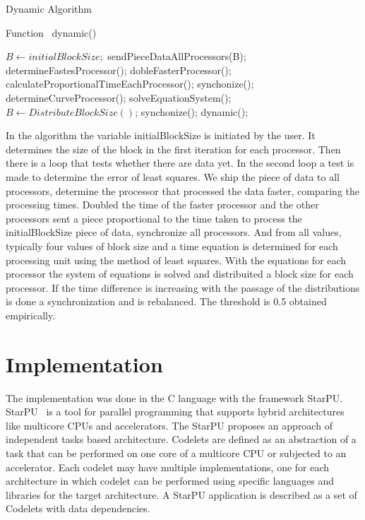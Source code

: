 \documentclass[journal]{IEEEtran}
\begin{document}
\begin{algorithm}

\caption{Dynamic Algorithm}
\label{alg1}

\begin{algorithmic}		

\STATE Function~ dynamic()

\STATE $B \leftarrow initialBlockSize;$
		\STATE sendPieceDataAllProcessors(B);
		\STATE determineFastesProcessor();
		\STATE dobleFasterProcessor();
	        \STATE calculateProportionalTimeEachProcessor();
		\STATE synchonize();
		\STATE determineCurveProcessor();
	\ENDWHILE
	\STATE solveEquationSystem();
	\STATE $B \leftarrow DistributeBlockSize()$;
		\STATE synchonize();
		\STATE dynamic();	
    	\ENDIF

\ENDWHILE

\end{algorithmic}
\end{algorithm}

In the algorithm the variable initialBlockSize is initiated by the user. It determines the size of the block in the first iteration for each processor. Then there is a loop that tests whether there are data yet. In the second loop a test is made to determine the error of least squares. We ship the piece of data to all processors, determine the processor that processed the data faster, comparing the processing times. Doubled the time of the faster processor and the other processors sent a piece proportional to the time taken to process the initialBlockSize piece of data, synchronize all processors. And from all values, typically four values ​​of block size and a time equation is determined for each processing unit using the method of least squares. With the equations for each processor the system of equations is solved and distribuited a block size for each processor. If the time difference is increasing with the passage of the distributions is done a synchronization and is rebalanced. The threshold is 0.5 obtained empirically.


\section{Implementation}

The implementation was done in the C language with the framework StarPU.
StarPU~\cite{starpu} is a tool for parallel programming that supports hybrid
architectures like multicore CPUs and accelerators. The StarPU proposes an
approach of independent tasks based architecture. Codelets are defined as an
abstraction of a task that can be performed on one core of a multicore CPU or
subjected to an accelerator. Each codelet may have multiple implementations, one
for each architecture in which codelet can be performed using specific languages
and libraries for the target architecture. A StarPU application is described as
a set of Codelets with data dependencies.
\end{document}
